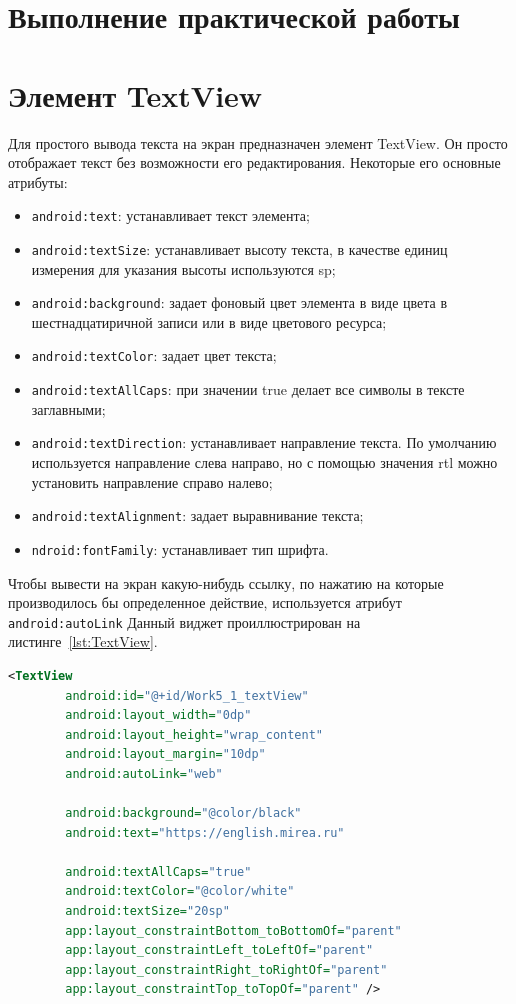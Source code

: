 \clearpage

\section*{\LARGE{Выполнение практической работы}}

\section{Элемент TextView}
Для простого вывода текста на экран предназначен элемент TextView. 
Он просто отображает текст без возможности его редактирования. 
Некоторые его основные атрибуты:

\begin{itemize}
	\item \texttt{android:text}: устанавливает текст элемента;
	\item \texttt{android:textSize}: устанавливает высоту текста,
		в качестве единиц измерения для указания высоты используются sp;
	\item \texttt{android:background}: задает фоновый цвет элемента в виде
		цвета в шестнадцатиричной записи или в виде цветового ресурса;
	\item \texttt{android:textColor}: задает цвет текста;
	\item \texttt{android:textAllCaps}: при значении true делает все символы
		в тексте заглавными;
	\item \texttt{android:textDirection}: устанавливает направление текста.
		По умолчанию используется направление слева направо, но с помощью
		значения rtl можно установить направление справо налево;
	\item \texttt{android:textAlignment}: задает выравнивание текста;
	\item \texttt{ndroid:fontFamily}: устанавливает тип шрифта.
\end{itemize}

Чтобы вывести на экран какую-нибудь ссылку,
по нажатию на которые производилось бы определенное действие,
используется атрибут \texttt{android:autoLink}
Данный виджет проиллюстрирован на листинге~\ref{lst:TextView}.
\begin{lstlisting}[language=xml, caption=\leftline{xml}, label=lst:TextView]
<TextView
        android:id="@+id/Work5_1_textView"
        android:layout_width="0dp"
        android:layout_height="wrap_content"
        android:layout_margin="10dp"
        android:autoLink="web"

        android:background="@color/black"
        android:text="https://english.mirea.ru"

        android:textAllCaps="true"
        android:textColor="@color/white"
        android:textSize="20sp"
        app:layout_constraintBottom_toBottomOf="parent"
        app:layout_constraintLeft_toLeftOf="parent"
        app:layout_constraintRight_toRightOf="parent"
        app:layout_constraintTop_toTopOf="parent" />
\end{lstlisting}


